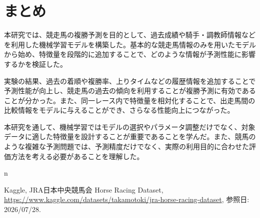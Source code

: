 \documentclass[dvipdfmx, a4paper, 11pt, titlepage]{jsarticle}
\begin{document}
\section{まとめ}
本研究では、競走馬の複勝予測を目的として、過去成績や騎手・調教師情報などを利用した機械学習モデルを構築した。基本的な競走馬情報のみを用いたモデルから始め、特徴量を段階的に追加することで、どのような情報が予測性能に影響するかを検証した。

実験の結果、過去の着順や複勝率、上りタイムなどの履歴情報を追加することで予測性能が向上し、競走馬の過去の傾向を利用することが複勝予測に有効であることが分かった。また、同一レース内で特徴量を相対化することで、出走馬間の比較情報をモデルに与えることができ、さらなる性能向上につながった。

本研究を通して、機械学習ではモデルの選択やパラメータ調整だけでなく、対象データに適した特徴量を設計することが重要であることを学んだ。また、競馬のような複雑な予測問題では、予測精度だけでなく、実際の利用目的に合わせた評価方法を考える必要があることを理解した。

\begin{thebibliography}{n}

Kaggle, JRA日本中央競馬会 Horse Racing Dataset,
\url{https://www.kaggle.com/datasets/takamotoki/jra-horse-racing-dataset}, 参照日: 2026/07/28.
\end{thebibliography}
\end{document}
